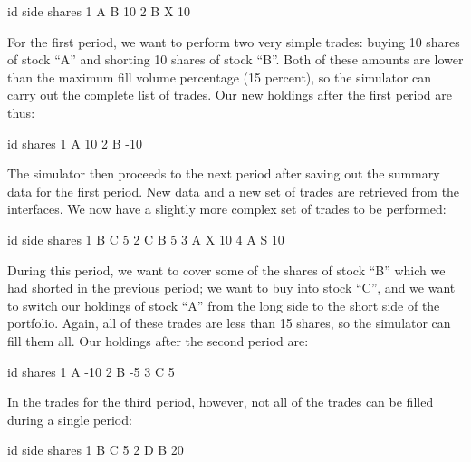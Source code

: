\documentclass{article}
\begin{document}
\begin{Schunk}
\begin{Soutput}
  id side shares
1  A    B     10
2  B    X     10
\end{Soutput}
\end{Schunk}

For the first period, we want to perform two very simple trades:
buying 10 shares of stock ``A'' and shorting 10 shares of stock ``B''.
Both of these amounts are lower than the maximum fill volume
percentage (15 percent), so the simulator can carry out the complete
list of trades.  Our new holdings after the first period are thus:

\begin{Schunk}
\begin{Soutput}
  id shares
1  A     10
2  B    -10
\end{Soutput}
\end{Schunk}

The simulator then proceeds to the next period after saving out the
summary data for the first period.  New data and a new set of trades
are retrieved from the interfaces.  We now have a slightly more
complex set of trades to be performed:

\begin{Schunk}
\begin{Soutput}
  id side shares
1  B    C      5
2  C    B      5
3  A    X     10
4  A    S     10
\end{Soutput}
\end{Schunk}

During this period, we want to cover some of the shares of stock ``B''
which we had shorted in the previous period; we want to buy into stock
``C'', and we want to switch our holdings of stock ``A'' from the long
side to the short side of the portfolio.  Again, all of these trades
are less than 15 shares, so the simulator can fill them all.  Our
holdings after the second period are:

\begin{Schunk}
\begin{Soutput}
  id shares
1  A    -10
2  B     -5
3  C      5
\end{Soutput}
\end{Schunk}

In the trades for the third period, however, not all of the trades can
be filled during a single period:

\begin{Schunk}
\begin{Soutput}
  id side shares
1  B    C      5
2  D    B     20
\end{Soutput}
\end{Schunk}
\end{document}
